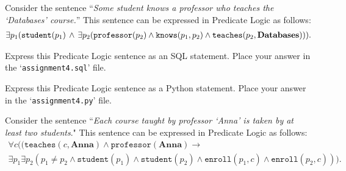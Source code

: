 \documentclass[12pt]{exam}
\newcommand{\knows}[2]{\mbox{\tt knows}(#1,#2)}
\newcommand{\teaches}[2]{\mathtt{teaches}(#1,#2)}
\newcommand{\enroll}[2]{\mathtt{enroll}(#1,#2)}
\newcommand{\student}[1]{\mathtt{student}(#1)}
\newcommand{\professor}[1]{\mathtt{professor}(#1)}
\renewcommand{\And}{\mathbin{\wedge}}
\newcommand{\Implies}{\mathbin{\rightarrow}}
\newcommand{\<}{\langle}
\renewcommand{\>}{\rangle}
\theoremstyle{definition}   %
\begin{document}
\begin{questions}



\question




Consider the sentence ``\emph{Some student knows a professor who teaches the `Databases' course.}''
This sentence can be expressed in Predicate Logic as follows:
\begin{multline*}
\exists p_1(\student{p_1}\,\And\, \exists p_2( \professor{p_2} \And \knows{p_1}{p_2}\And 
\teaches{p_2}{\mathbf{Databases}})).
\end{multline*}
\begin{parts}
\item  Express this Predicate Logic sentence as an SQL statement.   Place your answer in the `{\tt assignment4.sql}' file.
\item  Express this Predicate Logic sentence as a Python statement.   Place your answer in the `{\tt assignment4.py}' file.
\end{parts}

\question 
Consider the sentence ``\emph{Each course taught by professor `Anna' is taken by at least two students}."
This sentence can be expressed in Predicate Logic as follows:
\begin{multline*}
\forall c((\teaches{c}{\mathbf{Anna}}\And \professor{\mathbf{Anna}} \Implies \\
\exists p_1\exists p_2(p_1\neq p_2\And \student{p_1}\And \student{p_2}\And \enroll{p_1}{c} \And \enroll{p_2}{c})).
\end{multline*}
\end{questions}
\end{document}
